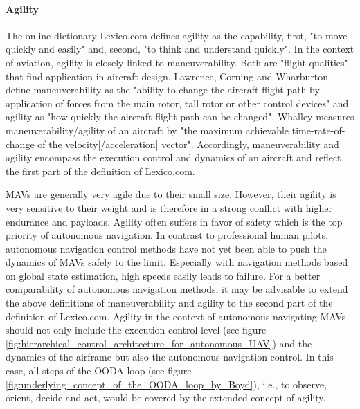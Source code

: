 \paragraph{Agility}
The online dictionary Lexico.com \cite{Lexico.com-agility} defines agility as the capability,
first, "to move quickly and easily" and, second, "to think and understand quickly".
In the context of aviation, agility is closely linked to maneuverability. 
Both are "flight qualities" \cite{Whalley1991} that find application in aircraft design.
Lawrence, Corning and Wharburton \cite{Lawrence1991} define
maneuverability as the "ability to change the aircraft flight path by application of forces from the main rotor, 
tall rotor or other control devices"
and agility as "how quickly the aircraft flight path can be changed".
Whalley \cite{Whalley1991} measures maneuverability/agility of an aircraft by
"the maximum achievable time-rate-of-change of the velocity[/acceleration] vector".
Accordingly, maneuverability and agility encompass the execution control and dynamics of an aircraft
and reflect the first part of the definition of Lexico.com.

MAVs are generally very agile due to their small size.
However, their agility is very sensitive to their weight and is therefore in a strong conflict with higher endurance and payloads. \cite{Verbeke2017}
Agility often suffers in favor of safety which is the top priority of autonomous navigation.
In contrast to professional human pilots,
autonomous navigation control methods have not yet been able to push the dynamics of MAVs safely to the limit. \cite{Kaufmann2018}
Especially  with navigation methods based on global state estimation, high speeds easily leads to failure. \cite{loquercio2018learning}
For a better comparability of autonomous navigation methods, it may be advisable to extend the above definitions of maneuverability and agility 
to the second part of the definition of Lexico.com.
Agility in the context of autonomous navigating MAVs should not only include the execution control level (see figure \ref{fig:hierarchical_control_architecture_for_autonomous_UAV})
and the dynamics of the airframe but also the autonomous navigation control.
In this case, all steps of the OODA loop (see figure \ref{fig:underlying_concept_of_the_OODA_loop_by_Boyd}), 
i.e., to observe, orient, decide and act, would be covered by the extended concept of agility.








